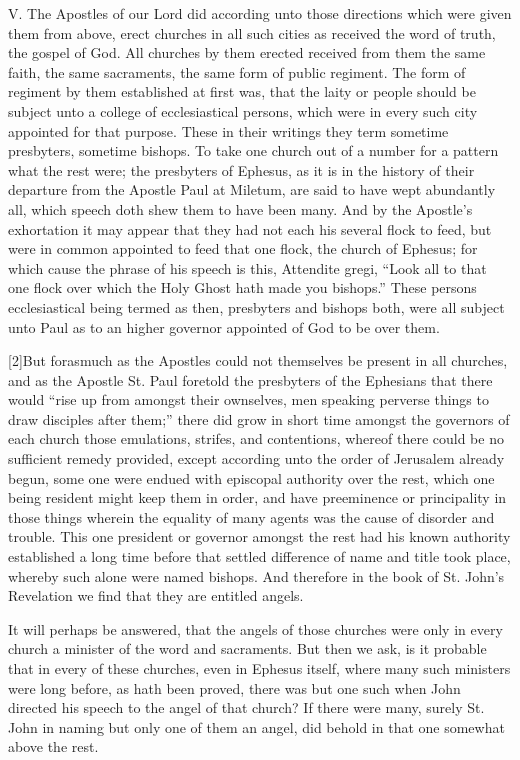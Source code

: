 V. The Apostles of our Lord did according unto those directions which were given them from above, erect churches in all such cities as received the word of truth, the gospel of God. All churches by them erected received from them the same faith, the same sacraments, the same form of public regiment. The form of regiment by them established at first was, that the laity or people should be subject unto a college of ecclesiastical persons, which were in every such city appointed for that purpose. These in their writings they term sometime presbyters, sometime bishops. To take one church out of a number for a pattern what the rest were; the presbyters of Ephesus, as it is in the history of their departure from the Apostle Paul at Miletum, are said to have wept abundantly all, which speech doth shew them to have been many. And by the Apostle’s exhortation it may appear that they had not each his several flock to feed, but were in common appointed to feed that one flock, the church of Ephesus; for which cause the phrase of his speech is this, Attendite gregi, “Look all to that one flock over which the Holy Ghost hath made you bishops.” These persons ecclesiastical being termed as then, presbyters and bishops both, were all subject unto Paul as to an higher governor appointed of God to be over them.

[2]But forasmuch as the Apostles could not themselves be present in all churches, and as the Apostle St. Paul foretold the presbyters of the Ephesians that there would “rise up from amongst their ownselves, men speaking perverse things to draw disciples after them;” there did grow in short time amongst the governors of each church those emulations, strifes, and contentions, whereof there could be no sufficient remedy provided, except according unto the order of Jerusalem already begun, some one were endued with episcopal authority over the rest, which one being resident might keep them in order, and have preeminence or principality in those things wherein the equality of many agents was the cause of disorder and trouble. This one president or governor amongst the rest had his known authority established a long time before that settled difference of name and title took place, whereby such alone were named bishops. And therefore in the book of St. John’s Revelation we find that they are entitled angels.

It will perhaps be answered, that the angels of those churches were only in every church a minister of the word and sacraments. But then we ask, is it probable that in every of these churches, even in Ephesus itself, where many such ministers were long before, as hath been proved, there was but one such when John directed his speech to the angel of that church? If there were many, surely St. John in naming but only one of them an angel, did behold in that one somewhat above the rest.

